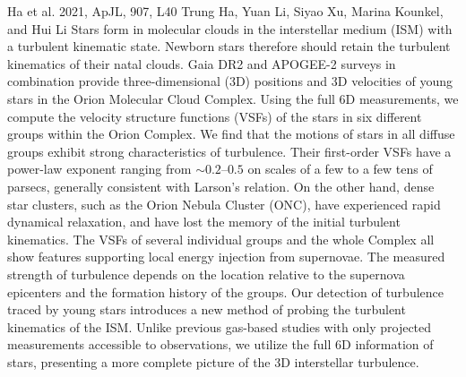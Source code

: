 \publicationdetails
{Ha et al. 2021, ApJL, 907, L40}
{Trung Ha\footnotemark[1], Yuan Li\footnotemark[1]\footnotemark[2], Siyao Xu\footnotemark[3]\footnotemark[7], Marina Kounkel\footnotemark[4], and Hui Li\footnotemark[5]\footnotemark[6]\footnotemark[7]}
{Stars form in molecular clouds in the interstellar medium (ISM) with a turbulent kinematic state. Newborn stars therefore should retain the turbulent kinematics of their natal clouds. Gaia DR2 and APOGEE-2 surveys in combination provide three-dimensional (3D) positions and 3D velocities of young stars in the Orion Molecular Cloud Complex. Using the full 6D measurements, we compute the velocity structure functions (VSFs) of the stars in six different groups within the Orion Complex. We find that the motions of stars in all diffuse groups exhibit strong characteristics of turbulence. Their first-order VSFs have a power-law exponent ranging from $\sim0.2$--$0.5$ on scales of a few to a few tens of parsecs, generally consistent with Larson's relation. On the other hand, dense star clusters, such as the Orion Nebula Cluster (ONC), have experienced rapid dynamical relaxation, and have lost the memory of the initial turbulent kinematics. The VSFs of several individual groups and the whole Complex all show features supporting local energy injection from supernovae. The measured strength of turbulence depends on the location relative to the supernova epicenters and the formation history of the groups. Our detection of turbulence traced by young stars introduces a new method of probing the turbulent kinematics of the ISM\@. Unlike previous gas-based studies with only projected measurements accessible to observations, we utilize the full 6D information of stars, presenting a more complete picture of the 3D interstellar turbulence.}
{
}

